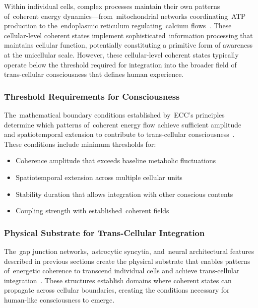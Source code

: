 Within individual cells, complex processes maintain their own patterns of~coherent energy dynamics—from~mitochondrial networks coordinating~ATP production to the~endoplasmic reticulum regulating~calcium flows~\cite{Hameroff2014, McFadden2020}. These cellular-level coherent states implement sophisticated~information processing that maintains cellular function, potentially constituting a primitive form of awareness at the unicellular scale. However, these cellular-level coherent states typically operate below the threshold required for integration into the broader field of trans-cellular consciousness that defines human experience.

\subsubsection{Threshold Requirements for Consciousness~~}

The~mathematical boundary conditions established by~ECC's principles determine which patterns of~coherent energy flow achieve sufficient amplitude and spatiotemporal extension to contribute to trans-cellular consciousness~\cite{breakspear2005dynamics, gershman2023molecular}. These conditions include minimum thresholds for:

\begin{itemize}
  \item Coherence amplitude that exceeds baseline metabolic fluctuations
  \item Spatiotemporal extension across multiple cellular units
  \item Stability duration that allows integration with other conscious contents
  \item Coupling strength with established~coherent fields
\end{itemize}

\subsubsection{Physical Substrate for Trans-Cellular Integration~~}

The~gap junction networks,~astrocytic syncytia, and~neural architectural features described in previous sections create the physical substrate that enables patterns of~energetic coherence to transcend individual cells and achieve trans-cellular integration~\cite{Yuste2020, hunt2024electromagnetic}. These structures establish domains where coherent states can propagate across cellular boundaries, creating the conditions necessary for human-like consciousness to emerge.

